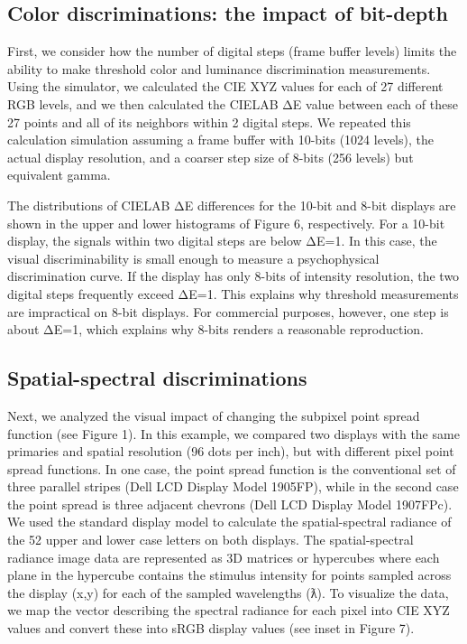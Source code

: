 \documentclass[
  letterpaper,
]{book}
\begin{document}
\subsection{Color discriminations: the impact of
bit-depth}\label{color-discriminations-the-impact-of-bit-depth}

First, we consider how the number of digital steps (frame buffer levels)
limits the ability to make threshold color and luminance discrimination
measurements. Using the simulator, we calculated the CIE XYZ values for
each of 27 different RGB levels, and we then calculated the CIELAB ΔE
value between each of these 27 points and all of its neighbors within 2
digital steps. We repeated this calculation simulation assuming a frame
buffer with 10-bits (1024 levels), the actual display resolution, and a
coarser step size of 8-bits (256 levels) but equivalent gamma.

The distributions of CIELAB ΔE differences for the 10-bit and 8-bit
displays are shown in the upper and lower histograms of Figure 6,
respectively. For a 10-bit display, the signals within two digital steps
are below ΔE=1. In this case, the visual discriminability is small
enough to measure a psychophysical discrimination curve. If the display
has only 8-bits of intensity resolution, the two digital steps
frequently exceed ΔE=1. This explains why threshold measurements are
impractical on 8-bit displays. For commercial purposes, however, one
step is about ΔE=1, which explains why 8-bits renders a reasonable
reproduction.

\subsection{Spatial-spectral
discriminations}\label{spatial-spectral-discriminations}

Next, we analyzed the visual impact of changing the subpixel point
spread function (see Figure 1). In this example, we compared two
displays with the same primaries and spatial resolution (96 dots per
inch), but with different pixel point spread functions. In one case, the
point spread function is the conventional set of three parallel stripes
(Dell LCD Display Model 1905FP), while in the second case the point
spread is three adjacent chevrons (Dell LCD Display Model 1907FPc). We
used the standard display model to calculate the spatial-spectral
radiance of the 52 upper and lower case letters on both displays. The
spatial-spectral radiance image data are represented as 3D matrices or
hypercubes where each plane in the hypercube contains the stimulus
intensity for points sampled across the display (x,y) for each of the
sampled wavelengths (ƛ). To visualize the data, we map the vector
describing the spectral radiance for each pixel into CIE XYZ values and
convert these into sRGB display values (see inset in Figure 7).
\end{document}
